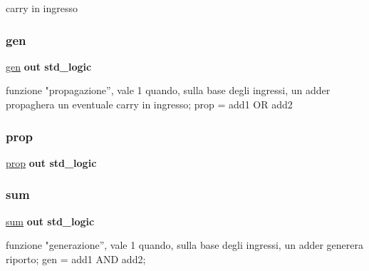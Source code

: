 carry in ingresso 

\mbox{\label{group___base_cell_gaad65a9c9ebd4dd83c2835249a1ba2dff}} 
\subsubsection{\texorpdfstring{gen}{gen}}
{\footnotesize\ttfamily \hyperlink{group___base_cell_gaad65a9c9ebd4dd83c2835249a1ba2dff}{gen} {\bfseries \textcolor{vhdlchar}{out}\textcolor{vhdlchar}{ }} {\bfseries \textcolor{vhdlchar}{std\+\_\+logic}\textcolor{vhdlchar}{ }} \hspace{0.3cm}{\ttfamily [Port]}}

funzione "propagazione”, vale 1 quando, sulla base degli ingressi, un adder propaghera\textquotesingle{} un eventuale carry in ingresso; prop = add1 OR add2 \mbox{\label{group___base_cell_gac94466f3a0e3e34f0231abcf4b667ade}} 
\subsubsection{\texorpdfstring{prop}{prop}}
{\footnotesize\ttfamily \hyperlink{group___base_cell_gac94466f3a0e3e34f0231abcf4b667ade}{prop} {\bfseries \textcolor{vhdlchar}{out}\textcolor{vhdlchar}{ }} {\bfseries \textcolor{vhdlchar}{std\+\_\+logic}\textcolor{vhdlchar}{ }} \hspace{0.3cm}{\ttfamily [Port]}}

\mbox{\label{group___base_cell_ga0d9fc1b21b42422b12d68ad73ca8ef13}} 
\subsubsection{\texorpdfstring{sum}{sum}}
{\footnotesize\ttfamily \hyperlink{group___base_cell_ga0d9fc1b21b42422b12d68ad73ca8ef13}{sum} {\bfseries \textcolor{vhdlchar}{out}\textcolor{vhdlchar}{ }} {\bfseries \textcolor{vhdlchar}{std\+\_\+logic}\textcolor{vhdlchar}{ }} \hspace{0.3cm}{\ttfamily [Port]}}

funzione "generazione”, vale 1 quando, sulla base degli ingressi, un adder generera\textquotesingle{} riporto; gen = add1 A\+ND add2; 